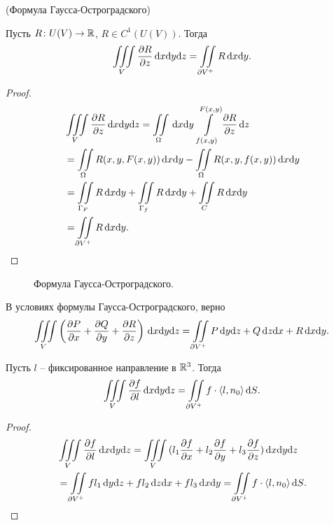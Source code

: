 \begin{theorem}(Формула Гаусса-Остроградского)

    Пусть $R \colon U(V) \to \mathbb{R}$, $R \in C^1(U(V))$. Тогда
\[
    \iiint\limits_{V}{\dfrac{\partial R}{\partial z} \,\mathrm{d} x \mathrm{d} y \mathrm{d} z} = \iint\limits_{\partial V^+}{R \,\mathrm{d} x \mathrm{d} y}
.\] 
\end{theorem}
\begin{proof}
    \begin{align*}
        &\iiint\limits_{V}{\dfrac{\partial R}{\partial z} \,\mathrm{d} x \mathrm{d} y \mathrm{d} z} = \iint\limits_{\Omega}{\,\mathrm{d} x \mathrm{d} y~
        {\int\limits_{f(x, y)}^{F(x, y)}{\dfrac{\partial R}{\partial z} \,\mathrm{d} z}}} \\
        &= \iint\limits_{\Omega}{R(x, y, F(x, y)) \,\mathrm{d} x \mathrm{d} y} - \iint\limits_{\Omega}{R(x, y, f(x, y)) \,\mathrm{d} x \mathrm{d} y} \\
        &= \iint\limits_{\Gamma_F}{R \,\mathrm{d} x \mathrm{d} y} + \iint\limits_{\Gamma_f}{R \,\mathrm{d} x \mathrm{d} y} + \iint\limits_{C}{R \,\mathrm{d} x \mathrm{d} y} \\
        &= \iint\limits_{\partial V^+}{R \,\mathrm{d} x \mathrm{d} y}
    .\end{align*}
\end{proof}

\begin{figure}[h!]
    \centering
    \caption{Формула Гаусса-Остроградского.}
\end{figure}

\begin{corollary}
    В условиях формулы Гаусса-Остроградского, верно
\[
    \iiint\limits_{V}{\left(\dfrac{\partial P}{\partial x} + \dfrac{\partial Q}{\partial y} + \dfrac{\partial R}{\partial z}\right) \,\mathrm{d} x \mathrm{d} y \mathrm{d} z} =
    \iint\limits_{\partial V^+}{P \,\mathrm{d} y \mathrm{d} z + Q \,\mathrm{d} z \mathrm{d} x + R \,\mathrm{d} x \mathrm{d} y}
.\]
\end{corollary}

\begin{corollary}
    Пусть $l$ -- фиксированное направление в $\mathbb{R}^3$. Тогда
\[
    \iiint\limits_{V}{\dfrac{\partial f}{\partial l} \,\mathrm{d} x \mathrm{d} y \mathrm{d} z} = 
    \iint\limits_{\partial V^+}{f \cdot \langle l, n_0 \rangle \,\mathrm{d} S}
.\] 
\end{corollary}
\begin{proof}
    \begin{align*}
        &\iiint\limits_V{\dfrac{\partial f}{\partial l} \,\mathrm{d} x \mathrm{d} y \mathrm{d} z} =
        \iiint\limits_V{(l_1 \dfrac{\partial f}{\partial x} + l_2 \dfrac{\partial f}{\partial y} + l_3 \dfrac{\partial f}{\partial z}) \,\mathrm{d} x \mathrm{d} y \mathrm{d} z} \\
        &= \iint\limits_{\partial V^+}{f l_1 \,\mathrm{d} y \mathrm{d} z + f l_2 \,\mathrm{d} z \mathrm{d} x + f l_3 \,\mathrm{d} x \mathrm{d} y}
        = \iint\limits_{\partial V^+}{f \cdot \langle l, n_0 \rangle \,\mathrm{d} S}
    .\end{align*}
\end{proof}

